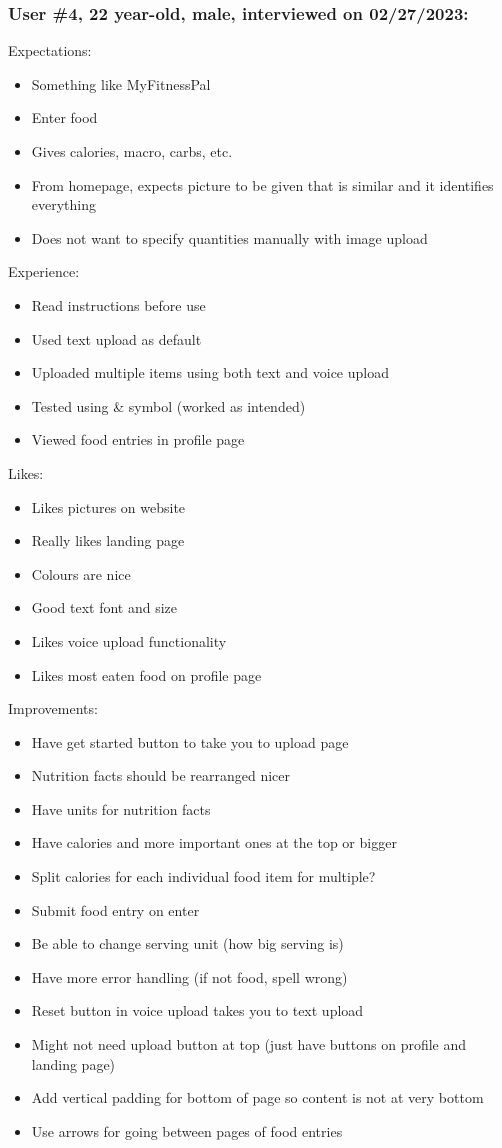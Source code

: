 \documentclass[12pt, titlepage]{article}
\begin{document}
	\subsubsection*{User \#4, 22 year-old, male, interviewed on 02/27/2023:}
	Expectations:
	\begin{itemize}
		\item Something like MyFitnessPal
		\item Enter food
		\item Gives calories, macro, carbs, etc.
		\item From homepage, expects picture to be given that is similar and it identifies everything
		\item Does not want to specify quantities manually with image upload
	\end{itemize}
	Experience:
	\begin{itemize}
		\item Read instructions before use
		\item Used text upload as default
		\item Uploaded multiple items using both text and voice upload
		\item Tested using \& symbol (worked as intended)
		\item Viewed food entries in profile page
	\end{itemize}
	Likes:
	\begin{itemize}
		\item Likes pictures on website
		\item Really likes landing page
		\item Colours are nice
		\item Good text font and size
		\item Likes voice upload functionality
		\item Likes most eaten food on profile page
	\end{itemize}
	Improvements:
	\begin{itemize}
		\item Have get started button to take you to upload page
		\item Nutrition facts should be rearranged nicer
		\item Have units for nutrition facts
		\item Have calories and more important ones at the top or bigger
		\item Split calories for each individual food item for multiple?
		\item Submit food entry on enter
		\item Be able to change serving unit (how big serving is)
		\item Have more error handling (if not food, spell wrong)
		\item Reset button in voice upload takes you to text upload
		\item Might not need upload button at top (just have buttons on profile and landing page)
		\item Add vertical padding for bottom of page so content is not at very bottom
		\item Use arrows for going between pages of food entries
	\end{itemize}
\end{document}
